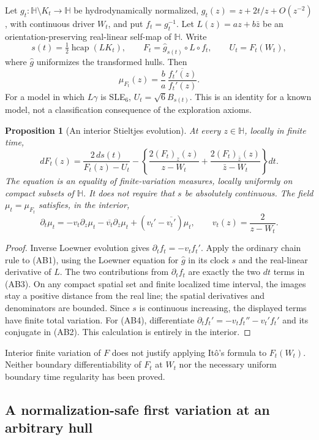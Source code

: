 \documentclass[11pt]{article}
\newtheorem{proposition}[theorem]{Proposition}
\theoremstyle{definition}\newtheorem{definition}[theorem]{Definition}
\theoremstyle{remark}\newtheorem{remark}[theorem]{Remark}
\begin{document}
Let $g_t:\mathbb H\setminus K_t\to\mathbb H$ be hydrodynamically
normalized, $g_t(z)=z+2t/z+O(z^{-2})$, with continuous driver $W_t$, and put
$f_t=g_t^{-1}$. Let $L(z)=az+b\bar z$ be an orientation-preserving
real-linear self-map of $\mathbb H$. Write
\[
 s(t)=\tfrac12\operatorname{hcap}(LK_t),\qquad
 F_t=\widehat g_{s(t)}\circ L\circ f_t,\qquad
 U_t=F_t(W_t),
 \tag{AB1}
\]
where $\widehat g$ uniformizes the transformed hulls. Then
\[
 \mu_{F_t}(z)=\frac ba\,
       \frac{\overline{f_t'(z)}}{f_t'(z)}.
 \tag{AB2}
\]
For a model in which $L\gamma$ is SLE$_6$, $U_t=\sqrt6B_{s(t)}$.
This is an identity for a known model, not a classification consequence
of the exploration axioms.

\begin{proposition}[An interior Stieltjes evolution]
\label{prop:beltrami-stieltjes}
At every $z\in\mathbb H$, locally in finite time,
\[
 dF_t(z)=\frac{2\,ds(t)}{F_t(z)-U_t}
 -\left\{\frac{2(F_t)_z(z)}{z-W_t}
          +\frac{2(F_t)_{\bar z}(z)}{\bar z-W_t}\right\}dt.
 \tag{AB3}
\]
The equation is an equality of finite-variation measures, locally
uniformly on compact subsets of $\mathbb H$. It does not require that
$s$ be absolutely continuous. The field
$\mu_t=\mu_{F_t}$ satisfies, in the interior,
\[
 \partial_t\mu_t
 =-v_t\partial_z\mu_t-\overline{v_t}\partial_{\bar z}\mu_t
       +(v_t'-\overline{v_t'})\mu_t,
 \qquad v_t(z)=\frac2{z-W_t}.
 \tag{AB4}
\]
\end{proposition}
\begin{proof}
Inverse Loewner evolution gives $\partial_tf_t=-v_tf_t'$. Apply the
ordinary chain rule to (AB1), using the Loewner equation for
$\widehat g$ in its clock $s$ and the real-linear derivative of $L$.
The two contributions from $\partial_tf_t$ are exactly the two
$dt$ terms in (AB3). On any compact spatial set and finite localized
time interval, the images stay a positive distance from the real line;
the spatial derivatives and denominators are bounded. Since $s$ is
continuous increasing, the displayed terms have finite total variation.
For (AB4), differentiate
$\partial_tf_t'=-v_tf_t''-v_t'f_t'$
and its conjugate in (AB2). This calculation is entirely in the interior.
\end{proof}

Interior finite variation of $F$ does not justify applying It\^o's formula
to $F_t(W_t)$. Neither boundary differentiability of $F_t$ at $W_t$ nor
the necessary uniform boundary time regularity has been proved.

\subsection{A normalization-safe first variation at an arbitrary hull}
\end{document}
